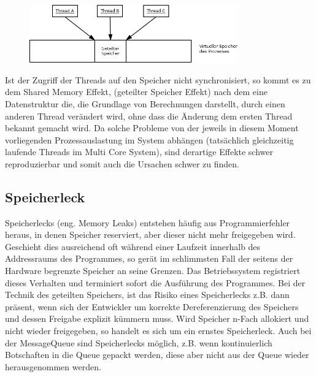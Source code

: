 \documentclass[12pt,oneside,a4paper,bibtotoc,liststotoc]{scrreprt}
\begin{document}
\begin{figure}[H]
  \begin{centering}
    \includegraphics[width=0.8\textwidth]{img/SharedMemory_RaceCondition.png}
    \label{SharedMemory_RaceCondition}
  \end{centering}
\end{figure}
Ist der Zugriff der Threads auf den Speicher nicht synchronisiert, so kommt es zu dem Shared Memory Effekt, (geteilter Speicher Effekt) nach dem eine Datenstruktur die, die Grundlage von Berechnungen darstellt, durch einen anderen Thread verändert wird, ohne dass die Änderung dem ersten Thread bekannt gemacht wird. Da solche Probleme von der jeweils in diesem Moment vorliegenden Prozessauslastung im System abhängen (tatsächlich gleichzeitig laufende Threads im Multi Core System), sind derartige Effekte schwer reproduzierbar und somit auch die Ursachen schwer zu finden.





\subsection{Speicherleck}
Speicherlecks (eng. Memory Leaks) entstehen häufig aus Programmierfehler heraus, in denen Speicher reserviert, aber dieser nicht mehr freigegeben wird. Geschieht dies ausreichend oft während einer Laufzeit innerhalb des Addressraums des Programmes, so gerät im schlimmsten Fall der seitens der Hardware begrenzte Speicher an seine Grenzen. Das Betriebssystem registriert dieses Verhalten und terminiert sofort die Ausführung des Programmes. Bei der Technik des geteilten Speichers, ist das Risiko eines Speicherlecks z.B. dann präsent, wenn sich der Entwickler um korrekte Dereferenzierung des Speichers und dessen Freigabe explizit kümmern muss. Wird Speicher n-Fach allokiert und nicht wieder freigegeben, so handelt es sich um ein ernstes Speicherleck. Auch bei der MessageQueue sind Speicherlecks möglich, z.B. wenn kontinuierlich Botschaften in die Queue gepackt werden, diese aber nicht aus der Queue wieder herausgenommen werden.
\end{document}
